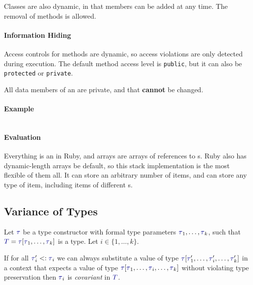 Classes are also dynamic, in that members can be added at any time.
The removal of methods is allowed.

\paragraph{Information Hiding}\label{par:Ruby_Info_Hiding}
Access controls for methods are dynamic, so access violations are only detected during execution.
The default method access level is \texttt{public}, but it can also be \texttt{protected} or \texttt{private}.

All data members of an  are private, and that \textbf{cannot} be changed.
\paragraph{Example}\label{par:Ruby_Abstract_Data_Type_Example}
\inputminted[frame=lines,linenos]{ruby}{./EDAP05-Concepts_Programming_Languages-Sections/Abstract_Data_Types/Code/Class_Example-Stack-Ruby.rb}

\paragraph{Evaluation}\label{par:Ruby_Abstract_Data_Type_Evaluation}
Everything is an  in Ruby, and arrays are arrays of references to s.
Ruby also has dynamic-length arrays be default, so this stack implementation is the most flexible of them all.
It can store an arbitrary number of items, and can store any type of item, including items of different s.

\subsection{Variance of Types}\label{subsec:Type_Variance}
\begin{definition}[Covariance]\label{def:Type_Covariance}
  Let $\DataType$ be a type constructor with formal type parameters $\DataType_{1}, \ldots , \DataType_{k}$, such that $\SemanticType{T} = \DataType [\DataType_{1}, \ldots, \DataType_{k}]$ is a type.
  Let $i \in \lbrace 1,\ldots, k \rbrace$.

  If for all $\DataType_{i}' <: \DataType_{i}$ we can always substitute a value of type $\DataType [\DataType_{1}',\ldots, \DataType_{i}', \ldots, \DataType_{k}']$ in a context that expects a value of type $\DataType [\DataType_{1}, \ldots, \DataType_{i}, \ldots, \DataType_{k}]$ without violating type preservation then $\DataType_{i}$ is \emph{covariant} in $\SemanticType{T}$.
\end{definition}

